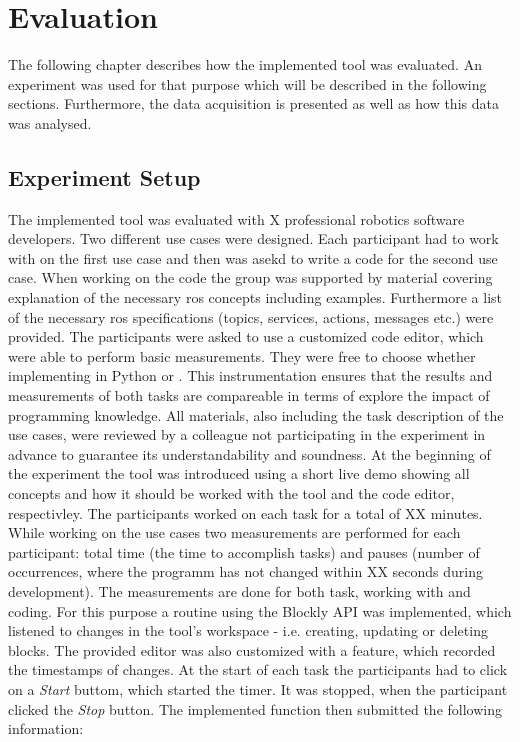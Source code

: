 \chapter{Evaluation}
The following chapter describes how the implemented tool was evaluated. An experiment was used for that purpose which will be described in the following sections. Furthermore, the data acquisition is presented as well as how this data was analysed.

\section{Experiment Setup} \label{sec:ExperimentSetup}
The implemented tool was evaluated with X professional robotics software developers. Two different use cases were designed. Each participant had to work with \toolname{} on the first use case and then was asekd to write a code for the second use case. When working on the code the group was supported by material covering explanation of the necessary \gls{ros} concepts including examples. Furthermore a list of the necessary \gls{ros} specifications (topics, services, actions, messages etc.) were provided. The participants were asked to use a customized code editor, which were able to perform basic measurements. They were free to choose whether implementing in Python or \Cpp{}. This instrumentation ensures that the results and measurements of both tasks are compareable in terms of explore the impact of programming knowledge. All materials, also including the task description of the use cases, were reviewed by a colleague not participating in the experiment in advance to guarantee its understandability and soundness. At the beginning of the experiment the tool was introduced using a short live demo showing all concepts and how it should be worked with the tool and the code editor, respectivley. The participants worked on each task for a total of XX minutes. \\

While working on the use cases two measurements are performed for each participant: total time (the time to accomplish tasks) and pauses (number of occurrences, where the programm has not changed within XX seconds during development). The measurements are done for both task, working with \toolname{} and coding. For this purpose a routine using the Blockly API was implemented, which listened to changes in the tool's workspace - i.e. creating, updating or deleting blocks. The provided editor was also customized with a feature, which recorded the timestamps of changes. At the start of each task the participants had to click on a \textit{Start} buttom, which started the timer. It was stopped, when the participant clicked the \textit{Stop} button. The implemented function then submitted the following information:

